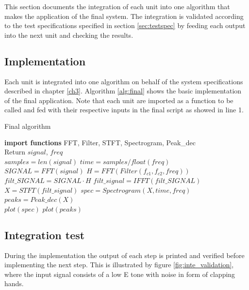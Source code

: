 This section documents the integration of each unit into one algorithm that makes the application of the final system. The integration is validated according to the test specifications specified in section \ref{sec:testspec} by feeding each output into the next unit and checking the results. 

\subsection{Implementation}
Each unit is integrated into one algorithm on behalf of the system specifications described in chapter \ref{ch3}. Algorithm \ref{alg:final} shows the basic implementation of the final application. Note that each unit are imported as a function to be called and fed with their respective inputs in the final script as showed in line 1.
\begin{algorithm}[H]
\caption{Final algorithm}
\begin{algorithmic}[1]
\State \textbf{import functions} FFT, Filter, STFT, Spectrogram, Peak\_dec  
\\
\State Return $signal$, $freq$ 
\EndProcedure 
\\
\State $samples = len(signal)$ 
\State $time   = samples/float(freq)$
\\
\State $SIGNAL = FFT(signal) $
\State $H = FFT(Filter(f_{c1},f_{c2},freq))$
\State $filt\_SIGNAL = SIGNAL \cdot H$
\State $filt\_signal = IFFT(filt\_SIGNAL)$  
\EndProcedure 
\\
\State $X = STFT(filt\_signal)$
\State $spec = Spectrogram(X,time,freq)$
\State $peaks = Peak\_dec(X)$
\EndProcedure
\\
\State $plot(spec)$ 
\State $plot(peaks)$
\EndProcedure
\end{algorithmic}
\label{alg:final}
\end{algorithm}          

\subsection{Integration test}
During the implementation the output of each step is printed and verified before implementing the next step. This is illustrated by figure \ref{fig:inte_validation}, where the input signal consists of a low E tone with noise in form of clapping hands.

